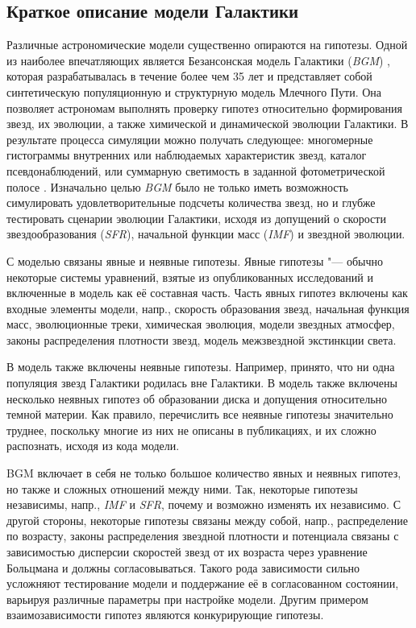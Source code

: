 \subsection{Краткое описание модели Галактики}
Различные астрономические модели существенно опираются на гипотезы. Одной из наиболее впечатляющих является 
Безансонская модель Галактики (\textit{BGM}) \cite{czekaj2014besanccon, robin2003synthetic}, которая разрабатывалась 
в течение более чем 35 лет и представляет собой синтетическую популяционную и структурную модель Млечного Пути. 
Она позволяет астрономам выполнять проверку гипотез относительно формирования звезд, их эволюции, а также химической 
и динамической эволюции Галактики. В результате процесса симуляции можно получать следующее: многомерные гистограммы 
внутренних или наблюдаемых характеристик звезд, каталог псевдонаблюдений, или суммарную светимость в заданной 
фотометрической полосе \cite{czekaj2012galaxy}. Изначально целью \textit{BGM} было не только иметь возможность 
симулировать удовлетворительные подсчеты количества звезд, но и глубже тестировать сценарии эволюции Галактики, 
исходя из допущений о скорости звездообразования (\textit{SFR}), начальной функции масс 
(\textit{IMF}) и звездной эволюции.

С моделью связаны явные и неявные гипотезы. Явные гипотезы "--- обычно некоторые системы уравнений, взятые из 
опубликованных исследований и включенные в модель как её составная часть. Часть явных гипотез включены как входные 
элементы модели, напр., скорость образования звезд, начальная функция масс, эволюционные треки, химическая эволюция, 
модели звездных атмосфер, законы распределения плотности звезд, модель межзвездной экстинкции света.

В модель также включены неявные гипотезы. Например, принято, что ни одна популяция звезд Галактики родилась вне 
Галактики. В модель также включены несколько неявных гипотез об образовании диска и допущения относительно темной 
материи. Как правило, перечислить все неявные гипотезы значительно труднее, поскольку многие из них не описаны в 
публикациях, и их сложно распознать, исходя из кода модели.

BGM включает в себя не только большое количество явных и неявных гипотез, но также и сложных отношений между ними. 
Так, некоторые гипотезы независимы, напр., \textit{IMF} и \textit{SFR}, почему и возможно изменять их независимо. 
С другой стороны, некоторые гипотезы связаны между собой, напр., распределение по возрасту, законы распределения 
звездной плотности и потенциала связаны с зависимостью дисперсии скоростей звезд от их возраста через уравнение 
Больцмана и должны согласовываться. Такого рода зависимости сильно усложняют тестирование модели и поддержание 
её в согласованном состоянии, варьируя различные параметры при настройке модели. Другим примером взаимозависимости 
гипотез являются конкурирующие гипотезы.

